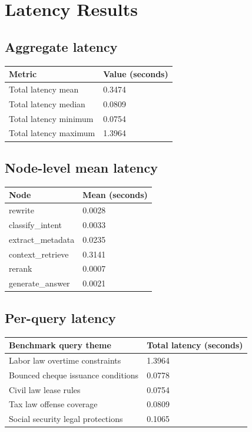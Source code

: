 \documentclass[12pt,a4paper]{article}
\begin{document}
\section{Latency Results}
\subsection*{Aggregate latency}
\begin{longtable}{p{} p{}}
\toprule
Metric & Value (seconds) \\
\midrule
Total latency mean & 0.3474 \\
Total latency median & 0.0809 \\
Total latency minimum & 0.0754 \\
Total latency maximum & 1.3964 \\
\bottomrule
\end{longtable}

\subsection*{Node-level mean latency}
\begin{longtable}{p{} p{}}
\toprule
Node & Mean (seconds) \\
\midrule
rewrite & 0.0028 \\
classify\_intent & 0.0033 \\
extract\_metadata & 0.0235 \\
context\_retrieve & 0.3141 \\
rerank & 0.0007 \\
generate\_answer & 0.0021 \\
\bottomrule
\end{longtable}

\subsection*{Per-query latency}
\begin{longtable}{p{} p{}}
\toprule
Benchmark query theme & Total latency (seconds) \\
\midrule
Labor law overtime constraints & 1.3964 \\
Bounced cheque issuance conditions & 0.0778 \\
Civil law lease rules & 0.0754 \\
Tax law offense coverage & 0.0809 \\
Social security legal protections & 0.1065 \\
\bottomrule
\end{longtable}
\end{document}

